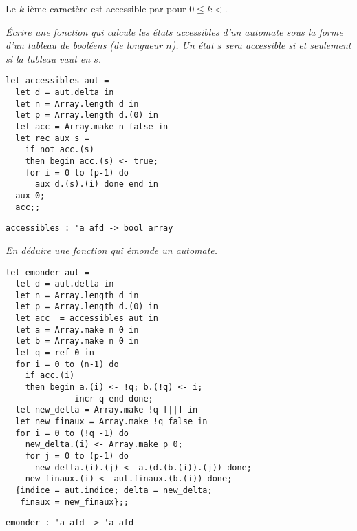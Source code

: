 Le $k$-ième caractère est accessible par  pour $0\le k < $.
\begin{Exercise}\it 
Écrire une fonction qui calcule les états accessibles d'un automate sous la forme d'un tableau de booléens (de longueur $n$). Un état $s$ sera accessible si et seulement si la tableau vaut  en $s$.
\end{Exercise} 
\begin{Answer}
\begin{lstlisting}
let accessibles aut =
  let d = aut.delta in
  let n = Array.length d in
  let p = Array.length d.(0) in
  let acc = Array.make n false in
  let rec aux s =
    if not acc.(s)
    then begin acc.(s) <- true;
    for i = 0 to (p-1) do 
      aux d.(s).(i) done end in
  aux 0;
  acc;;
\end{lstlisting}
\end{Answer} 
\begin{lstlisting}
accessibles : 'a afd -> bool array
\end{lstlisting}
\begin{Exercise}\it 
En déduire une fonction qui émonde un automate.
\end{Exercise} 
\begin{Answer}
\begin{lstlisting}
let emonder aut =
  let d = aut.delta in
  let n = Array.length d in
  let p = Array.length d.(0) in
  let acc  = accessibles aut in
  let a = Array.make n 0 in 
  let b = Array.make n 0 in 
  let q = ref 0 in
  for i = 0 to (n-1) do
    if acc.(i) 
    then begin a.(i) <- !q; b.(!q) <- i; 
              incr q end done;
  let new_delta = Array.make !q [||] in
  let new_finaux = Array.make !q false in
  for i = 0 to (!q -1) do
    new_delta.(i) <- Array.make p 0;
    for j = 0 to (p-1) do 
      new_delta.(i).(j) <- a.(d.(b.(i)).(j)) done;
    new_finaux.(i) <- aut.finaux.(b.(i)) done;
  {indice = aut.indice; delta = new_delta; 
   finaux = new_finaux};;
\end{lstlisting}
\newpage
\end{Answer} 
\begin{lstlisting}
emonder : 'a afd -> 'a afd
\end{lstlisting}
